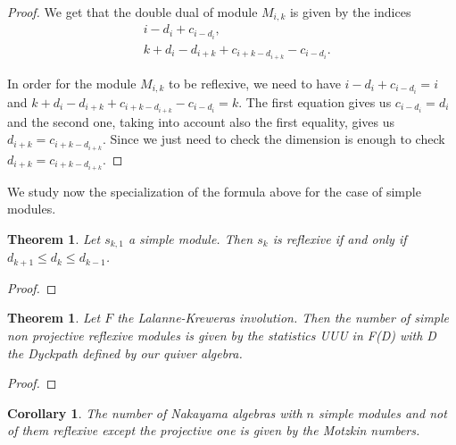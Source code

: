 \documentclass[12pt, a4paper]{article}
\numberwithin{equation}{section}
\theoremstyle{definition}
\theoremstyle{plain}
\newtheorem{corollary}[definition]{Corollary}
\newtheorem{theorem}[definition]{Theorem}
\theoremstyle{remark}
\begin{document}
\begin{proof}
We get that the double dual of module $M_{i,k}$ is given by the indices
\begin{align*}
    &i - d_i + c_{i - d_i}, \\
    &k + d_i - d_{i+k} + c_{i+k-{d_{i+k}}} - c_{i-d_i}.
\end{align*}

In order for the module $M_{i,k}$ to be reflexive, we need to have $i - d_i + c_{i - d_i} = i$ and $k + d_i - d_{i+k} + c_{i+k-{d_{i+k}}} - c_{i-d_i} = k$.
The first equation gives us $c_{i - d_i} = d_i$ and the second one, taking into account also the first equality, gives us $d_{i+k} = c_{i+k-{d_{i+k}}}$.
Since we just need to check the dimension is enough to check $d_{i+k}=c_{i+k-d_{i+k}}$.
\end{proof}
We study now the specialization of the formula above for the case of simple modules.
\begin{theorem}
Let $s_{k,1}$ a simple module. Then $s_k$ is reflexive
if and only if $d_{k+1}\leq d_k \leq d_{k-1}$.
\end{theorem}
\begin{proof}
	
\end{proof}
\begin{theorem}
	Let $F$ the Lalanne-Kreweras involution. 
	Then the number of simple non projective reflexive modules is given by the statistics UUU in F(D) with D the Dyckpath defined by our quiver algebra.
\end{theorem}
\begin{proof}

\end{proof}
\begin{corollary}
	The number of Nakayama algebras with $n$ simple modules and not of them reflexive except the projective one is given by the Motzkin numbers.
\end{corollary}
\end{document}
